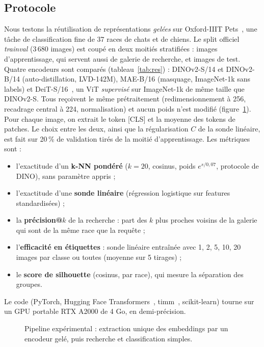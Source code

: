 \documentclass[11pt,a4paper]{article}
\begin{document}
\subsection{Protocole}
Nous testons la réutilisation de représentations \emph{gelées} sur Oxford-IIIT Pets~\citep{parkhi2012pets}, une tâche de classification fine de 37 races de chats et de chiens. Le split officiel \emph{trainval} (3\,680 images) est coupé en deux moitiés stratifiées : \RnTrain{} images d'apprentissage, qui servent aussi de galerie de recherche, et \RnTest{} images de test. Quatre encodeurs sont comparés (tableau~\ref{tab:res}) : DINOv2-S/14 et DINOv2-B/14 (auto-distillation, LVD-142M), MAE-B/16 (masquage, ImageNet-1k sans labels) et DeiT-S/16~\citep{touvron2021deit}, un ViT \emph{supervisé} sur ImageNet-1k de même taille que DINOv2-S. Tous reçoivent le même prétraitement (redimensionnement à 256, recadrage central à 224, normalisation) et aucun poids n'est modifié (figure~\ref{fig:pipeline}). Pour chaque image, on extrait le token [CLS] et la moyenne des tokens de patches. Le choix entre les deux, ainsi que la régularisation $C$ de la sonde linéaire, est fait sur 20\,\% de validation tirés de la moitié d'apprentissage. Les métriques sont :
\begin{itemize}
  \item l'exactitude d'un \textbf{k-NN pondéré} ($k=20$, cosinus, poids $e^{s/0{,}07}$, protocole de DINO), sans paramètre appris ;
  \item l'exactitude d'une \textbf{sonde linéaire} (régression logistique sur features standardisées) ;
  \item la \textbf{précision@$k$} de la recherche : part des $k$ plus proches voisins de la galerie qui sont de la même race que la requête ;
  \item l'\textbf{efficacité en étiquettes} : sonde linéaire entraînée avec 1, 2, 5, 10, 20 images par classe ou toutes (moyenne sur 5 tirages) ;
  \item le \textbf{score de silhouette} (cosinus, par race), qui mesure la séparation des groupes.
\end{itemize}
Le code (PyTorch, Hugging Face Transformers~\citep{wolf2020transformers}, timm~\citep{wightman2019timm}, scikit-learn) tourne sur un GPU portable RTX A2000 de 4 Go, en demi-précision.

\begin{figure}[ht]
  \centering
  \resizebox{0.8\textwidth}{!}{}
  \caption{Pipeline expérimental : extraction unique des embeddings par un encodeur gelé, puis recherche et classification simples.}
  \label{fig:pipeline}
\end{figure}
\end{document}
